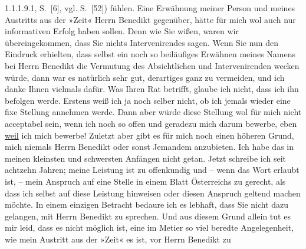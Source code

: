 \begin{ledgroupsized}[t]{13cm}
{{{                     1.1.1.9.1, S. [6], vgl. S. [52])}}}\label{K_L03553-3h} fühlen. Eine Erwähnung meiner
               Person und meines Austritts aus der »Zeit« Herrn
                  Benedikt gegenüber, hätte für mich wol auch
               nur informativen Erfolg haben sollen. Denn wie Sie wißen, waren wir übereingekommen,
               dass Sie nichts Intervenirendes sagen. Wenn Sie nun den Eindruck erhielten, dass
               selbst ein noch so beiläufiges Erwähnen meines Namens bei Herrn Benedikt die Vermutung des Absichtlichen und Intervenirenden
               wecken würde, dann war es natürlich sehr gut, derartiges ganz zu vermeiden, und ich
               danke Ihnen vielmals dafür. Was Ihren Rat betrifft, glaube ich nicht, dass ich ihn
               befolgen werde. Erstens weiß ich ja noch selber nicht, ob ich jemals wieder eine fixe
                  {\pb}Stellung annehmen werde.
               Dann aber würde diese Stellung wol für mich nicht acceptabel sein, wenn ich noch so
               offen und geradezu mich darum bewerbe, {\dotstwo} eben \uline{weil} ich mich bewerbe! Zuletzt aber gibt es für mich
               noch einen höheren Grund, mich niemals Herrn Benedikt oder sonst Jemandem anzubieten. Ich habe das in meinen kleinsten
               und schwersten Anfängen nicht getan. Jetzt schreibe ich seit achtzehn Jahren; meine
               Leistung ist zu offenkundig und – wenn das Wort erlaubt ist, – mein Anspruch auf eine
               Stelle in einem Blatt Österreichs zu gerecht,
               als dass ich selbst auf diese Leistung hinweisen oder diesen Anspruch geltend machen
               möchte.\pend
           \pstart
           In einem einzigen Betracht bedaure ich es lebhaft, dass Sie nicht dazu gelangen, mit
               Herrn Benedikt zu sprechen. Und aus diesem
               Grund allein tut es mir leid, dass es nicht möglich ist, eine im Metier so viel
               beredte Angelegenheit, wie mein Austritt aus der »Zeit« es ist, vor Herrn Benedikt zu

\end{ledgroupsized}
